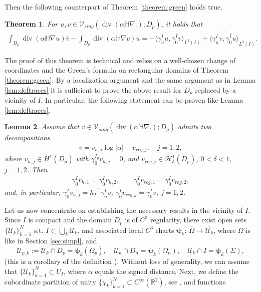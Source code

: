 \documentclass[report]{elsarticle}
\newtheorem{theorem}{Theorem}[section]
\newtheorem{lemma}[theorem]{Lemma}
\numberwithin{theorem}{section}
\newcommand{\bpsi}{\boldsymbol{\psi}}
\begin{document}
Then the following counterpart of Theorem \ref{theorem:green} holds true. 
\begin{theorem}
	\label{theorem:green_general}
	For $u, v\in 	\mathcal{V}_{sing}(\operatorname{div}(\alpha \mathbb{H}\nabla. ); D_p)$, it holds that 
	\begin{align*}
		\int_{D_p}\operatorname{div}(\alpha\mathbb{H}\nabla u)\overline{v}-	\int_{D_p}\overline{\operatorname{div}(\alpha\mathbb{H}\nabla v)}u=-\langle \gamma_n^I u, \overline{\gamma_0^I v}\rangle_{L^2(I)}+\overline{\langle \gamma_n^I v, \overline{\gamma_0^I u}\rangle}_{L^2(I)}.
	\end{align*}
\end{theorem}
The proof of this theorem is technical and relies on a well-chosen change of coordinates and the Green's formula on rectangular domains of Theorem \ref{theorem:green}. By a localization argument and the same argument as in Lemma \ref{lem:deftraces} it is sufficient to prove the above result for $D_p$ replaced by a vicinity of $I$. In particular, the following statement  can be proven like Lemma \ref{lem:deftraces}. 
\begin{lemma}
	\label{lem:deftraces_general}
	Assume that $v\in \mathcal{V}_{sing}(\operatorname{div}(\alpha\mathbb{H}\nabla.); D_p)$ admits two decompositions 
	\begin{align*}
		v=v_{h,j}\log|\alpha|+v_{reg,j},\quad j=1,2, 
	\end{align*}
	where $v_{h,j}\in H^1(D_p)$ with $\gamma_0^{I_p}v_{h,j}=0$, and $v_{reg,j}\in \mathcal{H}^1_{\delta}(D_p)$, $0<\delta<1$, \, $j=1,2$. Then
	\begin{align*}
		\gamma_0^I v_{h,1}=\gamma_0^I v_{h,2}, \qquad \gamma_0^I v_{reg,1}=\gamma_0^I v_{reg,2},
	\end{align*}
	and, in particular, $\gamma_0^Iv_{h,j}=h_{I}^{-1}\gamma_{n}^I v$, $\gamma_0^I v_{reg,j}=\gamma_0^I v$, $j=1,2$.
\end{lemma}
Let us now concentrate on establishing the necessary results in the vicinity of $I$. Since $I$ is compact and the domain $D_p$ is of $C^{3}$ regularity, there exist open sets $\{\mathcal{U}_k\}_{k=1}^N$ s.t. $I\subset \bigcup_{k}\mathcal{U}_k$, and associated local $C^{3}$ charts  $\bpsi_k: \, \overline{\Omega}\rightarrow \overline{\mathcal{U}_k}$, where $\Omega$ is like in Section \ref{sec:simpl}, and $$
\mathcal{U}_{p,k}:=\mathcal{U}_k\cap D_p=\bpsi_k(\Omega_p), \quad \mathcal{U}_k\cap D_n=\bpsi_k(\Omega_n), \quad \mathcal{U}_k\cap I = \bpsi_k(\Sigma),$$ (this is a corollary of the definition \cite[p.94]{gilbrag_trudinger}). Without loss of generality, we can assume that $\{\mathcal{U}_k\}_{k=1}^N\subset U_I$, where $\alpha$ equals the signed distance. Next, we define the subordinate partition of unity $\{\chi_k\}_{k=1}^N\subset C^{\infty}(\mathbb{R}^2)$, see \cite[Corollary 3.22]{mclean}, and functions 
\end{document}
